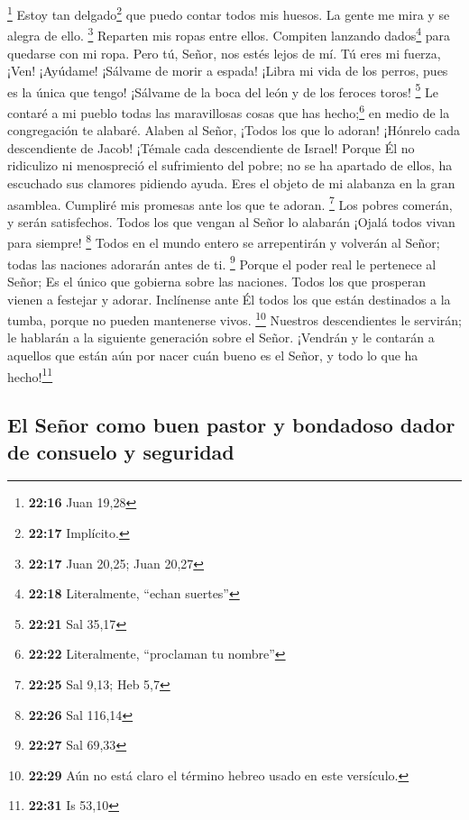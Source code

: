 \footnote{\textbf{22:16} Juan 19,28}  Estoy tan
delgado\footnote{\textbf{22:17} Implícito.} que puedo contar todos mis
huesos. La gente me mira y se alegra de ello. \footnote{\textbf{22:17}
  Juan 20,25; Juan 20,27}  Reparten mis ropas entre
ellos. Compiten lanzando dados\footnote{\textbf{22:18} Literalmente,
  ``echan suertes''} para quedarse con mi ropa.  Pero tú,
Señor, nos estés lejos de mí. Tú eres mi fuerza, ¡Ven! ¡Ayúdame!
 ¡Sálvame de morir a espada! ¡Libra mi vida de los
perros, pues es la única que tengo!  ¡Sálvame de la boca
del león y de los feroces toros! \footnote{\textbf{22:21} Sal 35,17}
 Le contaré a mi pueblo todas las maravillosas cosas que
has hecho;\footnote{\textbf{22:22} Literalmente, ``proclaman tu nombre''}
en medio de la congregación te alabaré.  Alaben al Señor,
¡Todos los que lo adoran! ¡Hónrelo cada descendiente de Jacob! ¡Témale
cada descendiente de Israel!  Porque Él no ridiculizo ni
menospreció el sufrimiento del pobre; no se ha apartado de ellos, ha
escuchado sus clamores pidiendo ayuda.  Eres el objeto de
mi alabanza en la gran asamblea. Cumpliré mis promesas ante los que te
adoran. \footnote{\textbf{22:25} Sal 9,13; Heb 5,7}  Los
pobres comerán, y serán satisfechos. Todos los que vengan al Señor lo
alabarán ¡Ojalá todos vivan para siempre! \footnote{\textbf{22:26} Sal
  116,14}  Todos en el mundo entero se arrepentirán y
volverán al Señor; todas las naciones adorarán antes de ti. \footnote{\textbf{22:27}
  Sal 69,33}  Porque el poder real le pertenece al Señor;
Es el único que gobierna sobre las naciones.  Todos los
que prosperan vienen a festejar y adorar. Inclínense ante Él todos los
que están destinados a la tumba, porque no pueden mantenerse vivos.
\footnote{\textbf{22:29} Aún no está claro el término hebreo usado en
  este versículo.}  Nuestros descendientes le servirán;
le hablarán a la siguiente generación sobre el Señor. 
¡Vendrán y le contarán a aquellos que están aún por nacer cuán bueno es
el Señor, y todo lo que ha hecho!\footnote{\textbf{22:31} Is 53,10}

\hypertarget{el-seuxf1or-como-buen-pastor-y-bondadoso-dador-de-consuelo-y-seguridad}{%
\subsection{El Señor como buen pastor y bondadoso dador de consuelo y
seguridad}\label{el-seuxf1or-como-buen-pastor-y-bondadoso-dador-de-consuelo-y-seguridad}}

